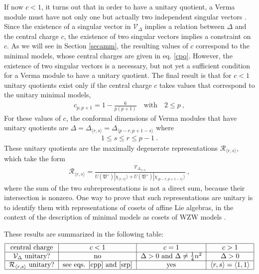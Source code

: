 \documentclass[12pt, a4paper, notitlepage, twoside]{report}
\numberwithin{equation}{section}
\theoremstyle{break}
\begin{document}
If now $c<1$, it turns out that in order to have a unitary quotient, a Verma module must have not only one but actually two independent singular vectors \cite{fms97}. 
Since the existence of a singular vector in $\mathcal{V}_\Delta$ implies a relation between $\Delta$ and the central charge $c$, the existence of two singular vectors implies a constraint on $c$. 
As we will see in Section \ref{secamm}, the resulting values of $c$ correspond to the minimal models, whose central charges are given in eq. \eqref{cpq}. 
However, the existence of two singular vectors is a necessary, but not yet a sufficient condition for a Verma module to have a unitary quotient.
The final result is that for $c<1$ unitary quotients exist only if the central charge $c$ takes values that correspond to the unitary minimal models,
\begin{align}
 c_{p,p+1} = 1-\frac{6}{p(p+1)}  \quad \text{with} \quad 2\leq p\ ,
\label{cpp}
\end{align}
For these values of $c$,
the conformal dimensions of Verma modules that have unitary quotients are $\Delta=\Delta_{\langle r,s \rangle}=\Delta_{\langle p-r, p+1-s \rangle}$ where
\begin{align}
   1\leq s\leq r\leq p-1 \ .
\label{srp}
\end{align}
These unitary quotients are the maximally degenerate representations $\mathcal{R}_{\langle r,s \rangle}$, which take the form
\begin{align}
 \mathcal{R}_{\langle r,s \rangle} = \frac{\mathcal{V}_{\Delta_{\langle r,s \rangle}}}{U(\mathfrak{V}^+)|\chi_{\langle r,s \rangle}\rangle + U(\mathfrak{V}^+)|\chi_{\langle p-r,p+1-s \rangle}\rangle}\ ,
\label{rrs}
\end{align}
where the sum of the two subrepresentations is not a direct sum, because their intersection is nonzero. One way to prove that such representations are unitary is to identify them with representations of cosets of affine Lie algebras, in the context of the description of minimal models as cosets of WZW models \cite{fms97}.

These results are summarized in the following table:
\begin{align}
 \begin{tabular}{|c|c|c|c|}
  \hline
central charge & $c<1$ & $c=1$ & $c>1$
\\
\hline
$\mathcal{V}_\Delta$ unitary? & no & $\Delta>0$ and $\Delta \neq \frac14 n^2$ & $\Delta>0$
\\
\hline
$\mathcal{R}_{\langle r,s\rangle}$ unitary? & see eqs. \eqref{cpp} and \eqref{srp} &  yes & $\langle r,s \rangle = \langle 1,1\rangle$
\\
\hline
 \end{tabular}
\end{align}
\end{document}
